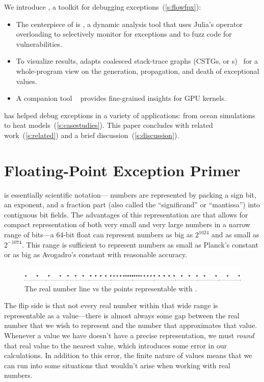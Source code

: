 \documentclass{juliacon}
\begin{document}
We introduce \FlowFPX{}, a toolkit for debugging
\fp{} exceptions~(\cref{s:flowfpx}):
\begin{itemize}
  \item
    The centerpiece of \FlowFPX{} is \FT{}, a dynamic analysis tool that uses
    Julia's operator overloading to selectively monitor for exceptions and to
    fuzz code for vulnerabilities.
  \item
    To visualize results, \FT{} adapts coalesced stack-trace graphs 
    (CSTGs, or \CSTG{}s)~\cite{humphreySystematicDebuggingMethods2014} for a whole-program view on the generation,
    propagation, and death of exceptional values.
  \item A companion tool \GPUFPX{}~\cite{llsflg-hpdc-2023} provides fine-grained insights for GPU kernels.
\end{itemize}
%
\FlowFPX{} has helped debug exceptions in a variety
of applications: from ocean simulations to heat models~(\cref{s:casestudies}).
This paper concludes with related work~(\cref{s:related}) and a
brief discussion~(\cref{s:discussion}).

\section{Floating-Point Exception Primer}
\label{s:background}

\Fp{} is essentially scientific notation---\fp{} numbers are represented by packing a sign bit, an exponent, and a fraction part (also called the ``significand'' or ``mantissa'') into contiguous bit fields.
The advantages of this representation are that allows for compact representation of both very small and very large numbers in a narrow range of bits---a 64-bit float can represent numbers as big as $2^{1024}$ and as small as $2^{-1074}$.
This range is sufficient to represent numbers as small as Planck's constant or as big as Avogadro's constant with reasonable accuracy.

\begin{figure}[h]
  \label{fig:real_vs_float}
  \includegraphics[width=\columnwidth]{ fig/real_vs_fp.png }
  \caption{The real number line vs the points representable with \fp{}.}
\end{figure}

The flip side is that not every real number within that wide range is representable as a \fp{} value---there is almost always some gap between the real number that we wish to represent and the \fp{} number that approximates that value.
Whenever a value we have doesn't have a precise representation, we must \emph{round} that real value to the nearest \fp{} value, which introduces some error in our calculations.
In addition to this error, the finite nature of \fp{} values means that we can run into some situations that wouldn't arise when working with real numbers.
\end{document}
